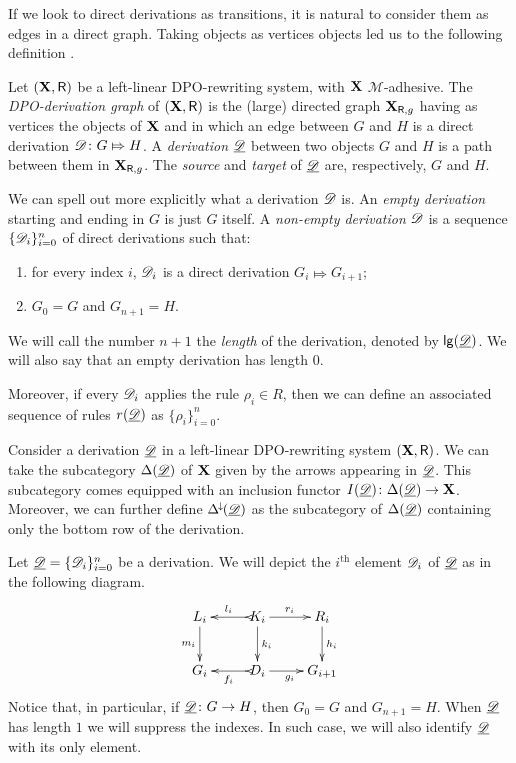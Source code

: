 If we look to direct derivations as transitions, it is natural to consider them as edges in a direct graph. Taking objects as vertices objects led us to the following definition \cite{heindel2009category}.

\begin{definition}
	Let $(\textbf {\textup{X}}, \mathsf{R})$ be a left-linear DPO-rewriting system, with $\textbf {\textup{X}}$ $\mathcal{M}$-adhesive. The \emph{DPO-derivation graph} of $(\textbf {\textup{X}}, \mathsf{R})$ is the (large)  directed graph $\textbf {\textup{X}}_{\mathsf{R}, g}$ having as vertices the objects of $\textbf {\textup{X}}$ and in which an edge between $G$ and $H$ is a direct derivation $\mathscr{D}\colon G\Mapsto H$.	A \emph{derivation} $\underline{\mathscr{D}}$ between two objects $G$ and $H$ is a path between them in $\textbf {\textup{X}}_{\mathsf{R}, g}$. The \emph{source} and \emph{target} of $\underline{\mathscr{D}}$ are, respectively, $G$ and $H$.
\end{definition}

\begin{remark}
	We can spell out more explicitly what  a derivation $\mathscr{D}$ is.  An \emph{empty derivation} starting and ending in $G$ is just $G$ itself.  A \emph{non-empty derivation} $\mathscr{D}$ is a sequence $\{\mathscr{D}_i\}_{i=0}^n$ of direct derivations such that:
	\begin{enumerate}
		\item for every index $i$, $\mathscr{D}_i$ is a direct derivation $G_i \Mapsto G_{i+1}$;
		\item $G_0=G$ and $G_{n+1}=H$.
	\end{enumerate}
	
	We will call the number $n+1$ the \emph{length} of the derivation, denoted by $\mathsf{lg}(\underline{\mathscr{D}})$. We will also say that an empty derivation has length $0$. 
	
	Moreover,  if every $\mathscr{D}_i$ applies the rule $\rho_i\in R$, then we can define an associated sequence of rules $r(\underline{\mathscr{D}})$ as $\{\rho_i\}_{i=0}^n$.
\end{remark}

\begin{remark}\label{rem:func}
	Consider a derivation $\underline{\mathscr{D}}$ in a left-linear DPO-rewriting system $(\textbf {\textup{X}}, \mathsf{R})$. We can take the subcategory $\Delta(\underline{\mathscr{D}})$ of $\textbf {\textup{X}}$ given by the arrows appearing in $\underline{\mathscr{D}}$. This subcategory comes equipped with an inclusion functor $I(\underline{\mathscr{D}})\colon \Delta(\underline{\mathscr{D}})\to \textbf {\textup{X}}$. Moreover, we can further define $\Delta^{\hspace{-1pt}\downarrow\hspace{-1pt}}(\underline{\mathscr{D}})$ as the subcategory of $\Delta(\underline{\mathscr{D}})$ containing only the bottom row of the derivation.
\end{remark}

\begin{notation}Let $\underline{\mathscr{D}}=\{\mathscr{D}_i\}_{i=0}^n$ be a derivation. We will depict the $i^\text{th}$ element $\mathscr{D}_i$ of $\underline{\mathscr{D}}$ as in the following diagram.  
	\[\xymatrix{L_i \ar[d]_{m_i}& K_i \ar[d]^{k_i}\ar@{>->}[l]_{l_i} \ar[r]^{r_i} & R_i \ar[d]^{h_i} \\G_{i} & \ar@{>->}[l]^{f_{i}} D_{i} \ar[r]_{g_{i}}& G_{i+1} }\]
	Notice that, in particular, if $\underline{\mathscr{D}}\colon G\to H$, then $G_0=G$ and $G_{n+1}=H$. When $\underline{\mathscr{D}}$ has length $1$ we will suppress the indexes. In such case, we will also identify $\underline{\mathscr{D}}$ with its only element. 
\end{notation} 

